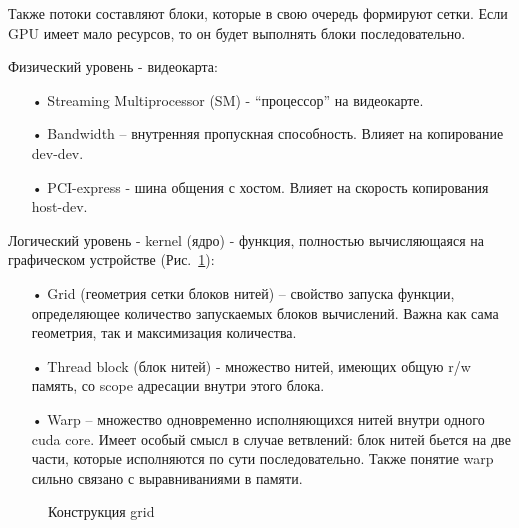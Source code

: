 \documentclass[a4paper,14pt,russian]{extreport}
\begin{document}
\par Также потоки составляют блоки, которые в свою очередь формируют сетки. Если GPU имеет мало ресурсов, то он будет выполнять блоки последовательно. 
\par Физический уровень - видеокарта:
  \begin{itemize}
  \item[•] Streaming Multiprocessor (SM) - “процессор” на видеокарте.
  \item[•] Bandwidth – внутренняя пропускная способность. Влияет на копирование dev-dev.
  \item[•] PCI-express - шина общения с хостом. Влияет на скорость копирования host-dev.
  \end{itemize}
\par Логический уровень - kernel (ядро) - функция, полностью вычисляющаяся на графическом устройстве (Рис.~\ref{ris:thread_block}):
  \begin{itemize}
  \item[•] Grid (геометрия сетки блоков нитей) – свойство запуска функции, определяющее количество запускаемых блоков вычислений. Важна как сама геометрия, так и максимизация количества.
  \item[•] Thread block (блок нитей) - множество нитей, имеющих общую r/w память, со scope адресации внутри этого блока.
  \item[•] Warp – множество одновременно исполняющихся нитей внутри одного cuda core. Имеет особый смысл в случае ветвлений: блок нитей бьется на две части, которые исполняются по сути последовательно. Также понятие warp сильно связано с выравниваниями в памяти.
  \end{itemize}
\par
  \begin{figure}[h]
  \caption{Конструкция grid}
  \label{ris:thread_block}
  \end{figure}
\end{document}
